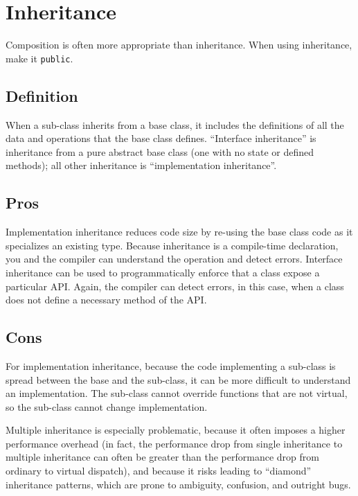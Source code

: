 
\section{Inheritance}\label{sec:inheritance}
Composition is often more appropriate than inheritance. When using inheritance, make it \texttt{public}.

\subsection{Definition}
When a sub-class inherits from a base class, it includes the definitions of all the data and operations that the base class defines. \enquote{Interface inheritance} is inheritance from a pure abstract base class (one with no state or defined methods); all other inheritance is \enquote{implementation inheritance}.

\subsection{Pros}
Implementation inheritance reduces code size by re-using the base class code as it specializes an existing type. Because inheritance is a compile-time declaration, you and the compiler can understand the operation and detect errors. Interface inheritance can be used to programmatically enforce that a class expose a particular API. Again, the compiler can detect errors, in this case, when a class does not define a necessary method of the API.

\subsection{Cons}
For implementation inheritance, because the code implementing a sub-class is spread between the base and the sub-class, it can be more difficult to understand an implementation. The sub-class cannot override functions that are not virtual, so the sub-class cannot change implementation.

Multiple inheritance is especially problematic, because it often imposes a higher performance overhead (in fact, the performance drop from single inheritance to multiple inheritance can often be greater than the performance drop from ordinary to virtual dispatch), and because it risks leading to \enquote{diamond} inheritance patterns, which are prone to ambiguity, confusion, and outright bugs.


